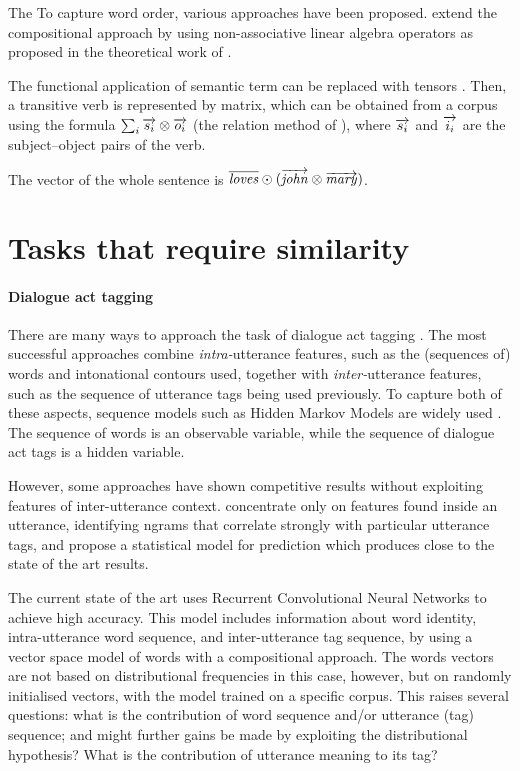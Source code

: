 The To capture word order, various approaches have been
proposed.  extend the
compositional approach by using non-associative linear algebra
operators as proposed in the theoretical work of
\cite{coecke2010}.

The functional application of semantic term can be replaced with tensors
\cite{bourbaki}. Then, a transitive verb is represented by matrix, which can be
obtained from a corpus using the formula $\sum_i\overrightarrow{s_i} \otimes \overrightarrow{o_i}$ (the
relation method of \cite{grefenstette2011experimental}), where $\overrightarrow{s_i}$ and
$\overrightarrow{i_i}$ are the subject--object pairs of the verb.

The vector of the whole sentence is $\overline{\mathit{loves}}
\odot(\overrightarrow{\mathit{john}} \otimes \overrightarrow{\mathit{mary}})$.

\section{Tasks that require similarity}
\label{sec:nlp-tasks}

\paragraph{Dialogue act tagging}
\label{sec:dialogue-act-tagging}

There are many ways to approach the task of dialogue act tagging
\cite{Stolcke.etal00}. The most successful approaches combine
\emph{intra-}utterance features, such as the (sequences of) words and
intonational contours used, together with \emph{inter-}utterance
features, such as the sequence of utterance tags being used
previously.
%
To capture both of these aspects, sequence models such as Hidden
Markov Models are widely used
\cite{Stolcke.etal00,surendran2006dialog}. The sequence of words is an
observable variable, while the sequence of dialogue act tags is a
hidden variable.

However, some approaches have shown competitive results without
exploiting features of inter-utterance
context.  concentrate only on features found
inside an utterance, identifying ngrams that correlate strongly with
particular utterance tags, and propose a statistical model for
prediction which produces close to the state of the art results.

The current state of the art \cite{kalchbrenner-blunsom2013CVSC} uses
Recurrent Convolutional Neural Networks to achieve high accuracy. This
model includes information about word identity, intra-utterance word
sequence, and inter-utterance tag sequence, by using a vector space
model of words with a compositional approach. The words vectors are
not based on distributional frequencies in this case, however, but on
randomly initialised vectors, with the model trained on a specific
corpus. This raises several questions: what is the contribution of
word sequence and/or utterance (tag) sequence; and might further gains
be made by exploiting the distributional hypothesis? What is the contribution of
utterance meaning to its tag?

